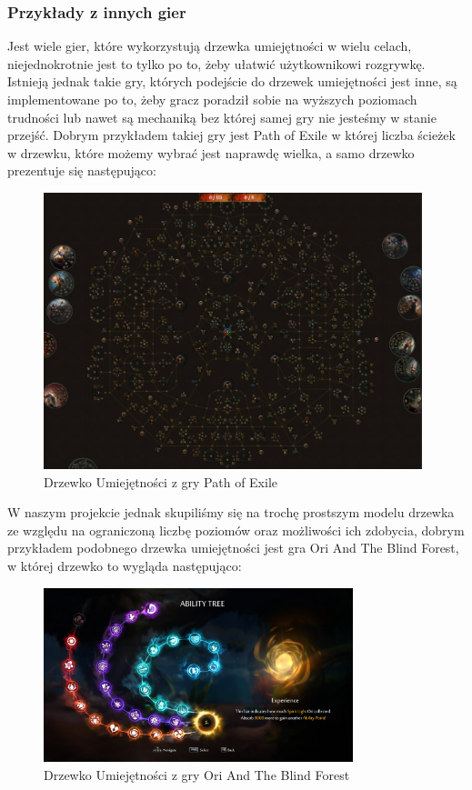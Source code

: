 \documentclass[oneside,polski,logo]{amuthesis}
\begin{document}
\subsubsection{Przykłady z innych gier}
Jest wiele gier, które wykorzystują drzewka umiejętności w wielu celach, niejednokrotnie jest to tylko po to, żeby ułatwić użytkownikowi rozgrywkę. Istnieją jednak takie gry, których podejście do drzewek umiejętności jest inne, są implementowane po to, żeby gracz poradził sobie na wyższych poziomach trudności lub nawet są mechaniką bez której samej gry nie jesteśmy w stanie przejść. Dobrym przykładem takiej gry jest Path of Exile w której liczba ścieżek w drzewku, które możemy wybrać jest naprawdę wielka, a samo drzewko prezentuje się następująco:
\begin{figure}[h]
	\centering
	\includegraphics[width=11cm]{images/kozubal/poe.png}
	\caption{Drzewko Umiejętności z gry Path of Exile}
\end{figure}
\newpage
W naszym projekcie jednak skupiliśmy się na trochę prostszym modelu drzewka ze względu na ograniczoną liczbę poziomów oraz możliwości ich zdobycia, dobrym przykładem podobnego drzewka umiejętności jest gra Ori And The Blind Forest, w której drzewko to wygląda następująco:
\begin{figure}[h]
	\centering
	\includegraphics[width=9cm]{images/kozubal/ori.jpg}
	\caption{Drzewko Umiejętności z gry Ori And The Blind Forest}
\end{figure}
\end{document}
